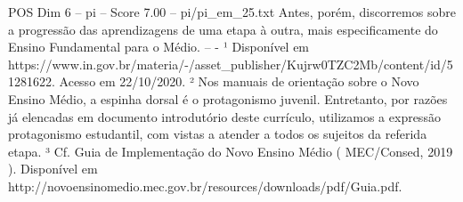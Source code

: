 \begin{textsample}{POS Dim 6 – pi – Score 7.00 – pi/pi\_em\_25.txt}
Antes, porém, discorremos sobre a progressão das aprendizagens de uma etapa à outra, mais especificamente do Ensino Fundamental para o Médio. -- - ¹ Disponível em https://www.in.gov.br/materia/-/asset\_publisher/Kujrw0TZC2Mb/content/id/51281622.
Acesso em 22/10/2020. ² Nos manuais de orientação sobre o Novo Ensino Médio, a espinha dorsal é o protagonismo juvenil.
Entretanto, por razões já elencadas em documento introdutório deste currículo, utilizamos a expressão protagonismo estudantil, com vistas a atender a todos os sujeitos da referida etapa. ³ Cf.
Guia de Implementação do Novo Ensino Médio ( MEC/Consed, 2019 ).
Disponível em http://novoensinomedio.mec.gov.br/resources/downloads/pdf/Guia.pdf.

\end{textsample}
